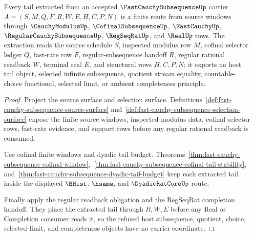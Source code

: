 \begin{theorem}
\label{thm:fast-cauchy-subsequence-tail-extraction-obligations}
Every tail extracted from an accepted $\FastCauchySubsequenceUp$ carrier $A=(S,M,Q,F,R,W,E,H,C,P,N)$ is a finite route from source windows through $\CauchyModulusUp$, $\CofinalSubsequenceUp$, $\FastCauchyUp$, $\RegularCauchySubsequenceUp$, $\RegSeqRatUp$, and $\RealUp$ rows. The extraction reads the source schedule $S$, inspected modulus row $M$, cofinal selector ledger $Q$, fast-rate row $F$, regular-subsequence handoff $R$, regular rational readback $W$, terminal seal $E$, and structural rows $H,C,P,N$; it exports no host tail object, selected infinite subsequence, quotient stream equality, countable-choice functional, selected limit, or ambient completeness principle.
\end{theorem}
\begin{proof}
Project the source surface and selection surface. Definitions~\ref{def:fast-cauchy-subsequence-source-surface} and~\ref{def:fast-cauchy-subsequence-selection-surface} expose the finite source windows, inspected modulus data, cofinal selector rows, fast-rate evidence, and support rows before any regular rational readback is consumed.

Use cofinal finite windows and dyadic tail budget. Theorems~\ref{thm:fast-cauchy-subsequence-cofinal-window},~\ref{thm:fast-cauchy-subsequence-cofinal-tail-stability}, and~\ref{thm:fast-cauchy-subsequence-dyadic-tail-budget} keep each extracted tail inside the displayed $\BHist$, $\hsame$, and $\DyadicRatCoreUp$ route.

Finally apply the regular readback obligation and the RegSeqRat completion handoff. They place the extracted tail through $R,W,E$ before any Real or Completion consumer reads it, so the refused host subsequence, quotient, choice, selected-limit, and completeness objects have no carrier coordinate.
\end{proof}

